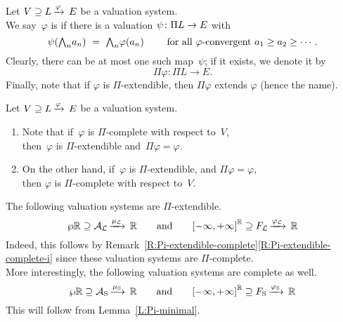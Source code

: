 \begin{dfn}
\label{D:Pi-extendible}
Let $V \supseteq L\,\smash{\xrightarrow{\varphi}\,E}$ be a valuation system.\\
We say~$\varphi$ is 
if there is a valuation $\psi \colon \Pi L \rightarrow E$ with
\begin{equation*}
\psi ( \bw_n a_n )
\ =\ 
\bw_n \varphi(a_n) 
\qquad
\text{ for all $\varphi$-convergent }
a_1 \geq a_2 \geq \dotsb.
\end{equation*}
Clearly,
there can be at most one such map~$\psi$;
if it exists, we denote it by 
\begin{equation*}
\Pi \varphi\colon \Pi L \longrightarrow E.
\end{equation*}
Finally,
note that if $\varphi$ is $\Pi$-extendible,
then $\Pi\varphi$ extends $\varphi$ (hence the name).
\end{dfn}
%
%
\begin{rem}
\label{R:Pi-extendible-complete}
Let $V \supseteq L\,\smash{\xrightarrow{\varphi}\,E}$ be a valuation system.
\begin{enumerate}
\item
\label{R:Pi-extendible-complete-i}
Note that if~$\varphi$ is $\Pi$-complete
with respect to~$V$,\\
then~$\varphi$ is $\Pi$-extendible and~$\Pi\varphi=\varphi$.

\item
On the other hand,
if~$\varphi$ is $\Pi$-extendible,
and $\Pi\varphi=\varphi$,\\
then $\varphi$ is $\Pi$-complete
with respect to~$V$.
\end{enumerate}
\end{rem}
%
%
\begin{ex}
The following valuation systems are $\Pi$-extendible.
\begin{equation*}
\wp{\mathbb{R}} \supseteq \mathcal{A}_{\mathcal{L}}\,\smash{\xrightarrow{\mu_{\mathcal{L}}}\,\mathbb{R}}\qquad\text{and}\qquad{[-\infty,+\infty]}^{\mathbb{R}} \supseteq F_{\mathcal{L}}\,\smash{\xrightarrow{\varphi_{\mathcal{L}}}\,\mathbb{R}}
\end{equation*}
Indeed, this follows by 
Remark~\ref{R:Pi-extendible-complete}\ref{R:Pi-extendible-complete-i}
since these valuation systems are $\Pi$-complete.\\
More interestingly,
the following valuation systems are complete as well.
\begin{equation*}
\wp{\mathbb{R}} \supseteq \mathcal{A}_{\mathrm{S}}\,\smash{\xrightarrow{\mu_{\mathrm{S}}}\,\mathbb{R}}\qquad\text{and}\qquad{[-\infty,+\infty]}^{\mathbb{R}} \supseteq F_{\mathrm{S}}\,\smash{\xrightarrow{\varphi_{\mathrm{S}}}\,\mathbb{R}}
\end{equation*}
This will follow from Lemma~\ref{L:Pi-minimal}.
\end{ex}

